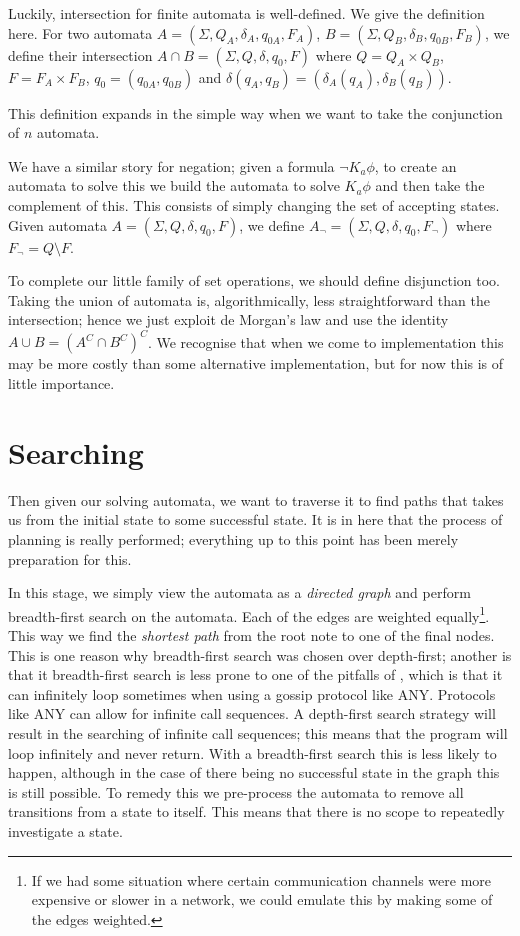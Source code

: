 \documentclass[10pt, a4paper]{report}
\begin{document}
Luckily, intersection for finite automata is well-defined. We give the
definition here. For two automata $A = (\Sigma, Q_A, \delta_A, q_{0A}, F_A)$, $B
= (\Sigma, Q_B, \delta_B, q_{0B}, F_B)$, we define their intersection $A \cap B =
(\Sigma, Q, \delta, q_0, F)$ where $Q = Q_A \times Q_B$, $F = F_A \times F_B$,
$q_0 = (q_{0A}, q_{0B})$ and $\delta(q_A, q_B) = (\delta_A(q_A), \delta_B(q_B))$.

This definition expands in the simple way when we want to take the conjunction
of $n$ automata. 

\bigskip

We have a similar story for negation; given a formula $\neg K_a \phi$, to create
an automata to solve this we build the automata to solve $K_a \phi$ and then
take the complement of this. This consists of simply changing the set of
accepting states. Given automata $A = (\Sigma, Q, \delta, q_0, F)$, we define
$A_\neg = (\Sigma, Q, \delta, q_0, F_\neg)$ where $F_\neg = Q \setminus F$.

\bigskip

To complete our little family of set operations, we should define disjunction
too. Taking the union of automata is, algorithmically, less straightforward than
the intersection; hence we just exploit de Morgan's law and use the identity $A
\cup B = (A^C \cap B^C)^C$. We recognise that when we come to implementation
this may be more costly than some alternative implementation, but for now this
is of little importance. 

\section{Searching}

Then given our solving automata, we want to traverse it to find paths that takes
us from the initial state to some successful state. It is in here that the
process of planning is really performed; everything up to this point has been
merely preparation for this. 

In this stage, we simply view the automata as a \emph{directed graph} and
perform breadth-first search on the automata. Each of the edges are weighted
equally\footnote{If we had some situation where certain communication channels
  were more expensive or slower in a network, we could emulate this by making
  some of the edges weighted.}. This way we find the \emph{shortest path} from
the root note to one of the final nodes. This is one reason why breadth-first
search was chosen over depth-first; another is that it breadth-first search is
less prone to one of the pitfalls of \cite{GithubGossip}, which is that it can
infinitely loop sometimes when using a gossip protocol like \textsf{ANY}.
Protocols like \textsf{ANY} can allow for infinite call sequences. A depth-first
search strategy will result in the searching of infinite call sequences; this
means that the program will loop infinitely and never return. With a
breadth-first search this is less likely to happen, although in the case of
there being no successful state in the graph this is still possible. To remedy
this we pre-process the automata to remove all transitions from a state to
itself. This means that there is no scope to repeatedly investigate a state. 
\end{document}
